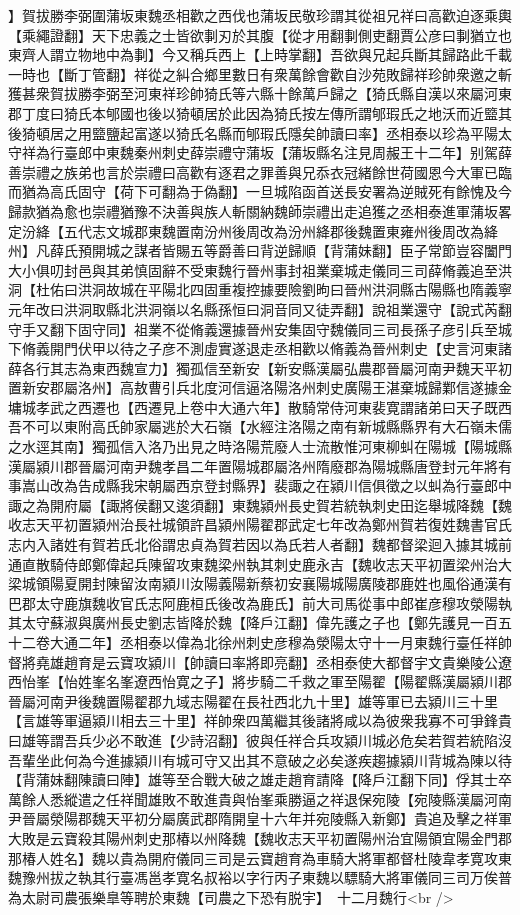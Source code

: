 】賀拔勝李弼圍蒲坂東魏丞相歡之西伐也蒲坂民敬珍謂其從祖兄祥曰高歡迫逐乘輿【乘繩證翻】天下忠義之士皆欲剚刃於其腹【從才用翻剚側吏翻賈公彦曰剚猶立也東齊人謂立物地中為剚】今又稱兵西上【上時掌翻】吾欲與兄起兵斷其歸路此千載一時也【斷丁管翻】祥從之糾合鄉里數日有衆萬餘會歡自沙苑敗歸祥珍帥衆邀之斬獲甚衆賀拔勝李弼至河東祥珍帥猗氏等六縣十餘萬戶歸之【猗氏縣自漢以來屬河東郡丁度曰猗氏本郇國也後以猗頓居於此因為猗氏按左傳所謂郇瑕氏之地沃而近盬其後猗頓居之用盬鹽起富遂以猗氏名縣而郇瑕氏隱矣帥讀曰率】丞相泰以珍為平陽太守祥為行臺郎中東魏秦州刺史薛崇禮守蒲坂【蒲坂縣名注見周赧王十二年】别駕薛善崇禮之族弟也言於崇禮曰高歡有逐君之罪善與兄忝衣冠緒餘世荷國恩今大軍已臨而猶為高氏固守【荷下可翻為于偽翻】一旦城陷函首送長安署為逆賊死有餘愧及今歸款猶為愈也崇禮猶豫不決善與族人斬關納魏師崇禮出走追獲之丞相泰進軍蒲坂畧定汾絳【五代志文城郡東魏置南汾州後周改為汾州絳郡後魏置東雍州後周改為絳州】凡薛氏預開城之謀者皆賜五等爵善曰背逆歸順【背蒲妹翻】臣子常節豈容闔門大小俱叨封邑與其弟慎固辭不受東魏行晉州事封祖業棄城走儀同三司薛脩義追至洪洞【杜佑曰洪洞故城在平陽北四固重複控據要險劉昫曰晉州洪洞縣古陽縣也隋義寧元年改曰洪洞取縣北洪洞嶺以名縣孫恒曰洞音同又徒弄翻】說祖業還守【說式芮翻守手又翻下固守同】祖業不從脩義還據晉州安集固守魏儀同三司長孫子彦引兵至城下脩義開門伏甲以待之子彦不測虛實遂退走丞相歡以脩義為晉州刺史【史言河東諸薛各行其志為東西魏宣力】獨孤信至新安【新安縣漢屬弘農郡晉屬河南尹魏天平初置新安郡屬洛州】高敖曹引兵北度河信逼洛陽洛州刺史廣陽王湛棄城歸鄴信遂據金墉城孝武之西遷也【西遷見上卷中大通六年】散騎常侍河東裴寛謂諸弟曰天子既西吾不可以東附高氏帥家屬逃於大石嶺【水經注洛陽之南有新城縣縣界有大石嶺未儒之水逕其南】獨孤信入洛乃出見之時洛陽荒廢人士流散惟河東柳虯在陽城【陽城縣漢屬潁川郡晉屬河南尹魏孝昌二年置陽城郡屬洛州隋廢郡為陽城縣唐登封元年將有事嵩山改為告成縣我宋朝屬西京登封縣界】裴諏之在潁川信俱徵之以虯為行臺郎中諏之為開府屬【諏將侯翻又逡須翻】東魏潁州長史賀若統執刺史田迄舉城降魏【魏收志天平初置潁州治長社城領許昌潁州陽翟郡武定七年改為鄭州賀若復姓魏書官氏志内入諸姓有賀若氏北俗謂忠貞為賀若因以為氏若人者翻】魏都督梁迴入據其城前通直散騎侍郎鄭偉起兵陳留攻東魏梁州執其刺史鹿永吉【魏收志天平初置梁州治大梁城領陽夏開封陳留汝南潁川汝陽義陽新蔡初安襄陽城陽廣陵郡鹿姓也風俗通漢有巴郡太守鹿旗魏收官氏志阿鹿桓氏後改為鹿氏】前大司馬從事中郎崔彦穆攻滎陽執其太守蘇淑與廣州長史劉志皆降於魏【降戶江翻】偉先護之子也【鄭先護見一百五十二卷大通二年】丞相泰以偉為北徐州刺史彦穆為滎陽太守十一月東魏行臺任祥帥督將堯雄趙育是云寶攻潁川【帥讀曰率將即亮翻】丞相泰使大都督宇文貴樂陵公遼西怡峯【怡姓峯名峯遼西怡寛之子】將步騎二千救之軍至陽翟【陽翟縣漢屬潁川郡晉屬河南尹後魏置陽翟郡九域志陽翟在長社西北九十里】雄等軍已去潁川三十里【言雄等軍逼潁川相去三十里】祥帥衆四萬繼其後諸將咸以為彼衆我寡不可爭鋒貴曰雄等謂吾兵少必不敢進【少詩沼翻】彼與任祥合兵攻潁川城必危矣若賀若統陷沒吾輩坐此何為今進據潁川有城可守又出其不意破之必矣遂疾趨據潁川背城為陳以待【背蒲妹翻陳讀曰陣】雄等至合戰大破之雄走趙育請降【降戶江翻下同】俘其士卒萬餘人悉縱遣之任祥聞雄敗不敢進貴與怡峯乘勝逼之祥退保宛陵【宛陵縣漢屬河南尹晉屬滎陽郡魏天平初分屬廣武郡隋開皇十六年并宛陵縣入新鄭】貴追及擊之祥軍大敗是云寶殺其陽州刺史那椿以州降魏【魏收志天平初置陽州治宜陽領宜陽金門郡那椿人姓名】魏以貴為開府儀同三司是云寶趙育為車騎大將軍都督杜陵韋孝寛攻東魏豫州拔之執其行臺馮邕孝寛名叔裕以字行丙子東魏以驃騎大將軍儀同三司万俟普為太尉司農張樂臯等聘於東魏【司農之下恐有脱宇】　十二月魏行<br />
